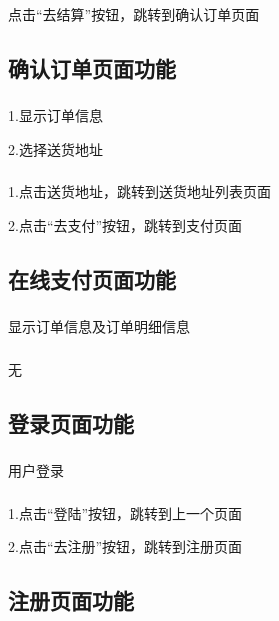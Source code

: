 \subsubsection*{}
点击“去结算”按钮，跳转到确认订单页面

\subsection{确认订单页面功能}
\subsubsection*{}
1.显示订单信息

2.选择送货地址
\subsubsection*{}
1.点击送货地址，跳转到送货地址列表页面

2.点击“去支付”按钮，跳转到支付页面

\subsection{在线支付页面功能}
\subsubsection*{}
显示订单信息及订单明细信息
\subsubsection*{}
无

\subsection{登录页面功能}
\subsubsection*{}
用户登录
\subsubsection*{}
1.点击“登陆”按钮，跳转到上一个页面

2.点击“去注册”按钮，跳转到注册页面

\subsection{注册页面功能}
